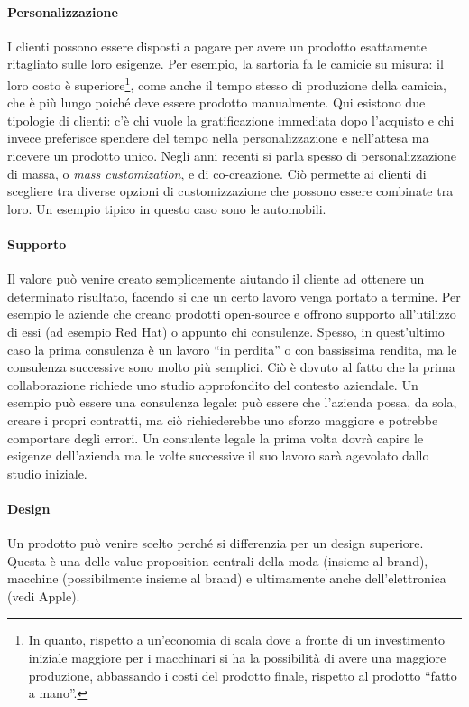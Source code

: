 \paragraph*{Personalizzazione} I clienti possono essere disposti a pagare per
avere un prodotto esattamente ritagliato sulle loro esigenze. Per esempio, la
sartoria fa le camicie su misura: il loro costo è superiore\footnote{In quanto,
rispetto a un'economia di scala dove a fronte di un investimento iniziale
maggiore per i macchinari si ha la possibilità di avere una maggiore
produzione, abbassando i costi del prodotto finale, rispetto al prodotto
``fatto a mano''.}, come anche il tempo stesso di produzione della camicia, che
è più lungo poiché deve essere prodotto manualmente. Qui esistono due tipologie
di clienti: c'è chi vuole la gratificazione immediata dopo l'acquisto e chi
invece preferisce spendere del tempo nella personalizzazione e nell'attesa ma
ricevere un prodotto unico.
Negli anni recenti si parla spesso di personalizzazione di massa, o
\textit{mass customization}, e di co-creazione. Ciò permette ai clienti di
scegliere tra diverse opzioni di customizzazione che possono essere combinate
tra loro. Un esempio tipico in questo caso sono le automobili.

\paragraph*{Supporto} Il valore può venire creato semplicemente aiutando il
cliente ad ottenere un determinato risultato, facendo si che un certo lavoro
venga portato a termine. Per esempio le aziende che creano prodotti
open-source e offrono supporto all'utilizzo di essi (ad esempio Red Hat) o
appunto chi consulenze. Spesso, in quest'ultimo caso la
prima consulenza è un lavoro ``in perdita'' o con bassissima rendita, ma le
consulenza successive sono molto più semplici. Ciò è dovuto al fatto che la
prima collaborazione richiede uno studio approfondito del contesto aziendale.
Un esempio può essere una consulenza legale: può essere che l'azienda possa, da
sola, creare i propri contratti, ma ciò richiederebbe uno sforzo maggiore e
potrebbe comportare degli errori. Un consulente legale la prima volta dovrà
capire le esigenze dell'azienda ma le volte successive il suo lavoro sarà
agevolato dallo studio iniziale.

\paragraph*{Design} Un prodotto può venire scelto perché si differenzia per un
design superiore. Questa è una delle value proposition centrali della moda
(insieme al brand), macchine (possibilmente insieme al brand) e ultimamente
anche dell'elettronica (vedi Apple).

